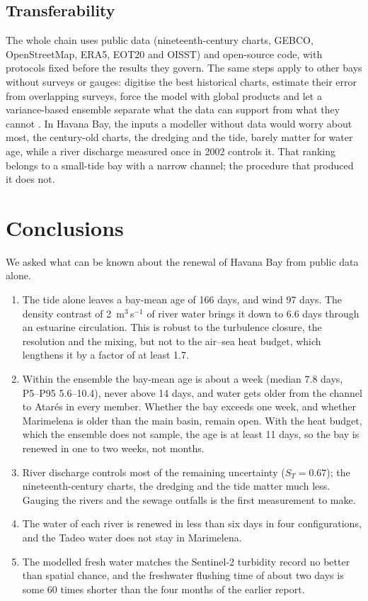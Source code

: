 \documentclass[a4paper,fleqn]{ems-dc}
\begin{document}
\subsection{Transferability}
The whole chain uses public data (nineteenth-century charts, GEBCO, OpenStreetMap, ERA5,
EOT20 and OISST) and open-source code, with protocols fixed before the results they govern.
The same steps apply to other bays without surveys or gauges: digitise the best historical
charts, estimate their error from overlapping surveys, force the model with global products
and let a variance-based ensemble separate what the data can support from what they cannot
\citep{Pianosi2016,Razavi2021}.
In Havana Bay, the inputs a modeller without data would worry about most, the century-old
charts, the dredging and the tide, barely matter for water age, while a river discharge
measured once in 2002 controls it. That ranking belongs to a small-tide bay with a narrow
channel; the procedure that produced it does not.

\section{Conclusions}\label{sec:conclusions}
We asked what can be known about the renewal of Havana Bay from public data alone.

\begin{enumerate}[label=(\arabic*),leftmargin=2.2em,itemsep=0pt]
\item The tide alone leaves a bay-mean age of 166 days, and wind 97 days. The density
contrast of 2~m$^3$\,s$^{-1}$ of river water brings it down to 6.6 days through an estuarine
circulation. This is robust to the turbulence closure, the resolution and the mixing, but not
to the air--sea heat budget, which lengthens it by a factor of at least 1.7.
\item Within the ensemble the bay-mean age is about a week (median 7.8 days, P5--P95
5.6--10.4), never above 14 days, and water gets older from the channel to Atar\'es in every
member. Whether the bay exceeds one week, and whether Marimelena is older than the main
basin, remain open. With the heat budget, which the ensemble does not sample, the age is at
least 11 days, so the bay is renewed in one to two weeks, not months.
\item River discharge controls most of the remaining uncertainty ($S_T = 0.67$); the
nineteenth-century charts, the dredging and the tide matter much less. Gauging the rivers
and the sewage outfalls is the first measurement to make.
\item The water of each river is renewed in less than six days in four configurations, and
the Tadeo water does not stay in Marimelena.
\item The modelled fresh water matches the Sentinel-2 turbidity record no better than
spatial chance, and the freshwater flushing time of about two days is some 60 times shorter
than the four months of the earlier report.
\end{enumerate}
\end{document}
